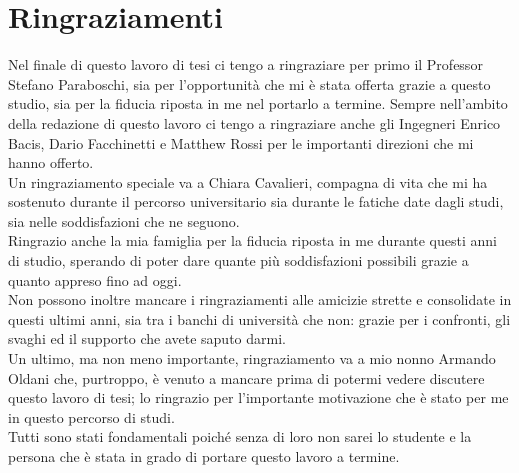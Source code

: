\documentclass[12pt,a4paper,twoside]{book}
\begin{document}
\chapter{Ringraziamenti}
Nel finale di questo lavoro di tesi ci tengo a ringraziare per primo il Professor Stefano Paraboschi, sia per l'opportunità che mi è stata offerta grazie a questo studio, sia per la fiducia riposta in me nel portarlo a termine. Sempre nell'ambito della redazione di questo lavoro ci tengo a ringraziare anche gli Ingegneri Enrico Bacis, Dario Facchinetti e Matthew Rossi per le importanti direzioni che mi hanno offerto.\\
Un ringraziamento speciale va a Chiara Cavalieri, compagna di vita che mi ha sostenuto durante il percorso universitario sia durante le fatiche date dagli studi, sia nelle soddisfazioni che ne seguono.\\
Ringrazio anche la mia famiglia per la fiducia riposta in me durante questi anni di studio, sperando di poter dare quante più soddisfazioni possibili grazie a quanto appreso fino ad oggi.\\
Non possono inoltre mancare i ringraziamenti alle amicizie strette e consolidate in questi ultimi anni, sia tra i banchi di università che non: grazie per i confronti, gli svaghi ed il supporto che avete saputo darmi.\\
Un ultimo, ma non meno importante, ringraziamento va a mio nonno Armando Oldani che, purtroppo, è venuto a mancare prima di potermi vedere discutere questo lavoro di tesi; lo ringrazio per l'importante motivazione che è stato per me in questo percorso di studi.\\
Tutti sono stati fondamentali poiché senza di loro non sarei lo studente e la persona che è stata in grado di portare questo lavoro a termine.

{}

\end{document}

